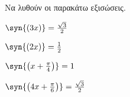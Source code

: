 Να λυθούν οι παρακάτω εξισώσεις.
\begin{alist}[leftmargin=3mm]
\begin{multicols}{2}
\item $ \syn{(3x)}=\frac{\sqrt{3}}{2} $
\item $ \syn{(2x)}=\frac{1}{2} $
\item $ \syn{\left( x+\frac{\pi}{4}\right) }=1 $
\item $ \syn{\left(4x+\frac{\pi}{6}\right)}=\frac{\sqrt{3}}{2} $
\end{multicols}
\end{alist}

